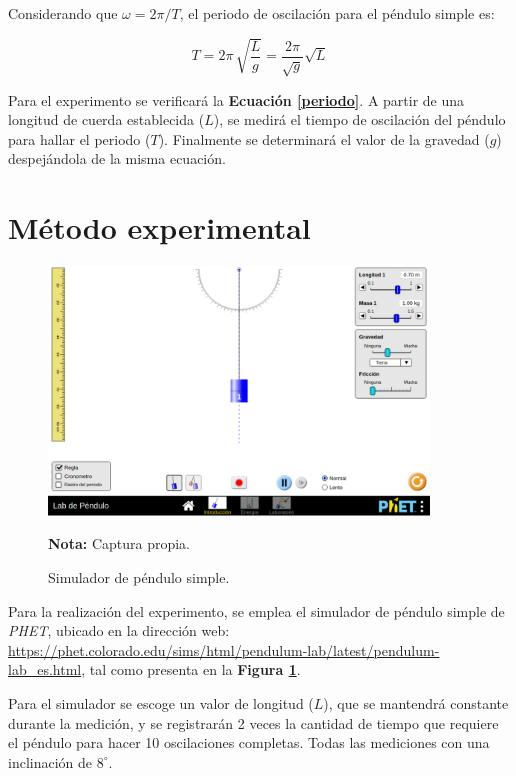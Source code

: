 \documentclass[letter,11pt]{article}
\newcommand{\source}[1]{\vspace{-11pt} \caption*{\small{\textbf{Nota:} {#1}}}}
\begin{document}
Considerando que $\omega = 2\pi / T$, el periodo de oscilación para el péndulo
simple es:

\begin{equation}
    T = 2\pi\, \sqrt{\frac{L}{g}} = \frac{2\pi}{\sqrt{g}} \sqrt{L}
\label{periodo}
\end{equation}
\vspace{0.10cm}

Para el experimento se verificará la \textbf{Ecuación \ref{periodo}}.
A partir de una longitud de cuerda establecida ($L$), se medirá el tiempo de
oscilación del péndulo para hallar el periodo ($T$). Finalmente se determinará
el valor de la gravedad ($g$) despejándola de la misma ecuación.

\section{Método experimental}

\begin{figure}
\centering
\includegraphics[width=0.90\textwidth]{resources/f2.eps}
\caption{Simulador de péndulo simple.}
\label{figura2}
\source{Captura propia.}
\end{figure}

Para la realización del experimento, se emplea el simulador de péndulo simple de
\emph{PHET}, ubicado en la dirección web: \url{
https://phet.colorado.edu/sims/html/pendulum-lab/latest/pendulum-lab_es.html},
tal como presenta en la \textbf{Figura \ref{figura2}}.

Para el simulador se escoge un valor de longitud ($L$), que se mantendrá
constante durante la medición, y se registrarán 2 veces la cantidad de tiempo
que requiere el péndulo para hacer 10 oscilaciones completas. Todas las
mediciones con una inclinación de $8^\circ$.
\end{document}
